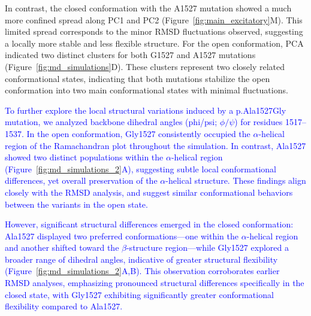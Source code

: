 In contrast, the closed conformation with the A1527 mutation showed a much more confined spread along PC1 and PC2 (Figure~\ref{fig:main_excitatory}M). This limited spread corresponds to the minor RMSD fluctuations observed, suggesting a locally more stable and less flexible structure. 
For the open conformation, PCA indicated two distinct clusters for both G1527 and A1527 mutations (Figure~\ref{fig:md_simulations}D). These clusters represent two closely related conformational states, indicating that both mutations stabilize the open conformation into two main conformational states with minimal fluctuations. 

\newcommand{\quoteM}{\textcolor{blue}{To further explore the local structural variations induced by a p.Ala1527Gly mutation, we analyzed backbone dihedral angles (phi/psi; $\phi/\psi$) for residues 1517–1537. In the open conformation, Gly1527 consistently occupied the $\alpha$-helical region of the Ramachandran plot throughout the simulation. In contrast, Ala1527 showed two distinct populations within the $\alpha$-helical region (Figure~\ref{fig:md_simulations_2}A), suggesting subtle local conformational differences, yet overall preservation of the $\alpha$-helical structure. These findings align closely with the RMSD analysis, and suggest similar conformational behaviors between the variants in the open state. \label{quoteM-label}}}

\quoteM

\newcommand{\quoteN}{\textcolor{blue}{However, significant structural differences emerged in the closed conformation: Ala1527 displayed two preferred conformations—one within the $\alpha$-helical region and another shifted toward the $\beta$-structure region—while Gly1527 explored a broader range of dihedral angles, indicative of greater structural flexibility (Figure~\ref{fig:md_simulations_2}A,B). This observation corroborates earlier RMSD analyses, emphasizing pronounced structural differences specifically in the closed state, with Gly1527 exhibiting significantly greater conformational flexibility compared to Ala1527.}}

\quoteN

\newcommand{\quoteO}{\textcolor{blue}{To complement backbone angle analysis, we also evaluated secondary structure stability throughout the simulation. In the open state, secondary structure content was comparable between variants, maintaining similar $\alpha$-helical character (Figure~\ref{fig:md_simulations_2}C). Upon transitioning to the closed state, both variants experienced a substantial loss of $\alpha$-helical content across residues 1517–1537. Nonetheless, residues 1520–1525 retained partial $\alpha$-helical structure more robustly in the Ala1527 variant compared to Gly1527 (Figure~\ref{fig:md_simulations_2}C)}}

